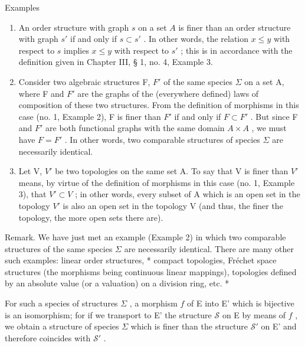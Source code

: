 Examples

\begin{enumerate}
\def\labelenumi{(\arabic{enumi})}
\item
  An order structure with graph \(s\) on a set \(A\) is finer than an order structure with graph \(s'\) if and only if \(s \subset s'\) . In other words, the relation \(x \leqslant y\) with respect to \(s\) implies \(x \leqslant y\) with respect to \(s'\) ; this is in accordance with the definition given in Chapter III, § 1, no. 4, Example 3.
\item
  Consider two algebraic structures F, \(F'\) of the same species \(\Sigma\) on a set A, where F and \(F'\) are the graphs of the (everywhere defined) laws of composition of these two structures. From the definition of morphisms in this case (no. 1, Example 2), F is finer than \(F'\) if and only if \(F \subset F'\) . But since F and \(F'\) are both functional graphs with the same domain \(A \times A\) , we must have \(F = F'\) . In other words, two comparable structures of species \(\Sigma\) are necessarily identical.
\item
  Let V, \(V'\) be two topologies on the same set A. To say that V is finer than \(V'\) means, by virtue of the definition of morphisms in this case (no. 1, Example 3), that \(V' \subset V\) ; in other words, every subset of A which is an open set in the topology \(V'\) is also an open set in the topology V (and thus, the finer the topology, the more open sets there are).
\end{enumerate}

Remark. We have just met an example (Example 2) in which two comparable structures of the same species \(\Sigma\) are necessarily identical. There are many other such examples: linear order structures, * compact topologies, Fréchet space structures (the morphisms being continuous linear mappings), topologies defined by an absolute value (or a valuation) on a division ring, etc. *

For such a species of structures \(\Sigma\) , a morphism \(f\) of E into E' which is bijective is an isomorphism; for if we transport to E' the structure \(\mathcal{S}\) on E by means of \(f\) , we obtain a structure of species \(\Sigma\) which is finer than the structure \(\mathcal{S}'\) on E' and therefore coincides with \(\mathcal{S}'\) .

